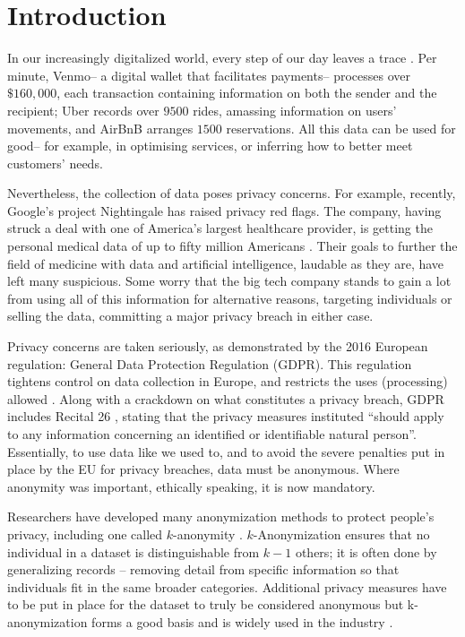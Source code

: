 \chapter{Introduction}
In our increasingly digitalized world, every step of our day leaves a trace \cite{data_stats}. Per minute, Venmo-- a digital wallet that facilitates payments-- processes over $\$160,000$, each transaction containing information on both the sender and the recipient; Uber records over $9500$ rides, amassing information on users' movements, and AirBnB arranges $1500$ reservations. All this data can be used for good-- for example, in optimising services, or inferring how to better meet customers' needs.

Nevertheless, the collection of data poses privacy concerns. For example, recently, Google's project Nightingale has raised privacy red flags. The company, having struck a deal with one of America's largest healthcare provider, is getting the personal medical data of up to fifty million Americans \cite{guardian_data}. Their goals to further the field of medicine with data and artificial intelligence, laudable as they are, have left many suspicious. Some worry that the big tech company stands to gain a lot from using all of this information for alternative reasons, targeting individuals or selling the data, committing a major privacy breach in either case. 

Privacy concerns are taken seriously, as demonstrated by the 2016 European regulation: General Data Protection Regulation (GDPR). This regulation tightens control on data collection in Europe, and restricts the uses (processing) allowed \cite{gdpr_basic}. Along with a crackdown on what constitutes a privacy breach, GDPR includes Recital 26 \cite{recital26}, stating that the privacy measures instituted 
``should apply to any information concerning an identified or identifiable natural person''. Essentially, to use data like we used to, and to avoid the severe penalties put in place by the EU for privacy breaches, data must be anonymous. Where anonymity was important, ethically speaking, it is now mandatory.

Researchers have developed many anonymization methods to protect people's privacy, including one called $k$-anonymity \cite{kanon_orig}. $k$-Anonymization ensures that no individual in a dataset is distinguishable from $k-1$ others; it is often done by generalizing records -- removing detail from specific information so that individuals fit in the same broader categories. Additional privacy measures have to be put in place for the dataset to truly be considered anonymous but k-anonymization forms a good basis \cite{critique_kanon} and is widely used in the industry \cite{google2020anonymizing}.

